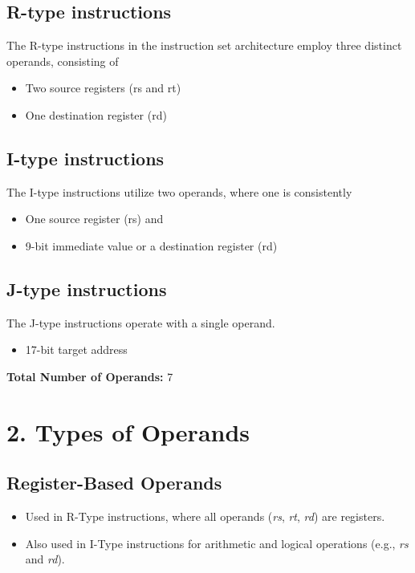 \documentclass[12pt, onecolumn]{report}
\begin{document}
\subsection*{R-type instructions}
The R-type instructions in the instruction set architecture employ three distinct operands, consisting of
\begin{itemize}
    \item Two source registers (rs and rt) 
    \item One destination register (rd)
\end{itemize}

\subsection*{I-type instructions }
The I-type instructions utilize two operands, where one is consistently

\begin{itemize}
    \item One source register (rs) and
    \item 9-bit immediate value or a destination register (rd)
\end{itemize}

\subsection*{J-type instructions}
 The J-type instructions operate with a single operand.
 \begin{itemize}
    \item  17-bit target address
\end{itemize}
\textbf{Total Number of Operands:} 7
\hfill



\section*{2. Types of Operands}

\subsection*{Register-Based Operands}
\begin{itemize}
    \item Used in R-Type instructions, where all operands (\textit{rs}, \textit{rt}, \textit{rd}) are registers.
    \item Also used in I-Type instructions for arithmetic and logical operations (e.g., \textit{rs} and \textit{rd}).
\end{itemize}
\end{document}
